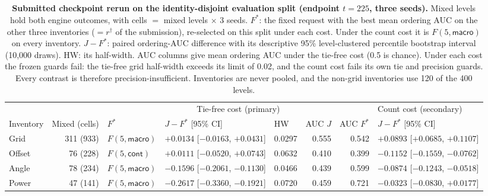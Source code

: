 \subsection{\texorpdfstring{}{Identity-Disjoint Rerun of the Submitted Checkpoint on the Evaluation Split}}
\label{sec:app:dev:rerun}

\begin{table}[t]
\centering
\scriptsize
\setlength{\tabcolsep}{2pt}
\begin{revblock}
\caption{\textbf{Submitted checkpoint rerun on the identity-disjoint evaluation split (endpoint $t=225$, three seeds).} Mixed levels hold both engine outcomes, with cells $=$ mixed levels $\times$ 3 seeds. $F^{*}$: the fixed request with the best mean ordering AUC on the other three inventories ($=r^\dagger$ of the submission), re-selected on this split under each cost. Under the count cost it is $F(5,\textsf{macro})$ on every inventory. $J-F^{*}$: paired ordering-AUC difference with its descriptive 95\% level-clustered percentile bootstrap interval (10{,}000 draws). HW: its half-width. AUC columns give mean ordering AUC under the tie-free cost (0.5 is chance). Under each cost the frozen guards fail: the tie-free grid half-width exceeds its limit of 0.02, and the count cost fails its own tie and precision guards. Every contrast is therefore precision-insufficient. Inventories are never pooled, and the non-grid inventories use 120 of the 400 levels.}
\label{tab:app:dev:rerun}
\begin{tabular}{@{}lrlllrrl@{}}
\toprule
 & & \multicolumn{5}{c}{Tie-free cost (primary)} & Count cost (secondary) \\
\cmidrule(lr){3-7}\cmidrule(l){8-8}
Inventory & Mixed (cells) & $F^{*}$ & $J-F^{*}$ [95\% CI] & HW & AUC $J$ & AUC $F^{*}$ & $J-F^{*}$ [95\% CI] \\
\midrule
Grid   & 311 (933) & $F(5,\textsf{macro})$ & $+0.0134$ [$-0.0163$, $+0.0431$] & 0.0297 & 0.555 & 0.542 & $+0.0893$ [$+0.0685$, $+0.1107$] \\
Offset & 76 (228)  & $F(5,\textsf{cont})$  & $+0.0111$ [$-0.0520$, $+0.0743$] & 0.0632 & 0.410 & 0.399 & $-0.1152$ [$-0.1559$, $-0.0762$] \\
Angle  & 78 (234)  & $F(5,\textsf{macro})$ & $-0.1596$ [$-0.2061$, $-0.1130$] & 0.0466 & 0.439 & 0.599 & $-0.0874$ [$-0.1243$, $-0.0518$] \\
Power  & 47 (141)  & $F(5,\textsf{macro})$ & $-0.2617$ [$-0.3360$, $-0.1921$] & 0.0720 & 0.459 & 0.721 & $-0.0323$ [$-0.0830$, $+0.0177$] \\
\bottomrule
\end{tabular}
\end{revblock}
\end{table}

